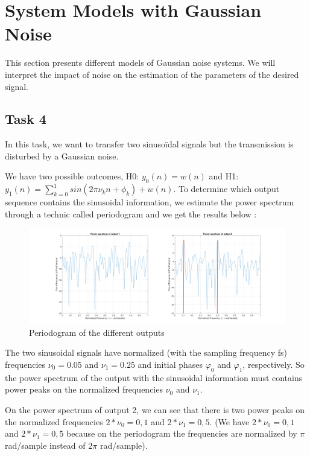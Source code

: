\documentclass[onecolumn, 12pt]{IEEEtran}
\begin{document}
\section{System Models with Gaussian Noise}

This section presents different models of Gaussian noise systems. We will interpret the impact of noise on the estimation of the parameters of the desired signal.

\subsection*{Task 4}

In this task, we want to transfer two sinusoïdal signals but the transmission is disturbed by a Gaussian noise. 

We have two possible outcomes, H0: $y_0(n) = w(n)$ and H1: $y_1(n) = \sum_{k=0}^{1}{sin(2\pi \nu_k n + \phi_k)} + w(n)$. To determine which output sequence contains the sinusoïdal information, we estimate the power spectrum through a technic called periodogram and we get the results below :

\begin{multicols}{2}
\begin{figure}[H]
	\centering
	\includegraphics[scale = 0.11]{Task4.png}
	\caption{Periodogram of the different outputs}
\label{fig:Fig4}
\end{figure}

The two sinusoidal signals have normalized (with the sampling frequency fs) frequencies $\nu_0 = 0.05$ and $\nu_1 = 0.25$ and initial phases $\varphi_0$ and $\varphi_1$, respectively. So the power spectrum of the output with the sinusoïdal information must contains power peaks on the normalized frequencies $\nu_0$ and $\nu_1$.
\end{multicols}




On the power spectrum of output 2, we can see that there is two power peaks on the normalized frequencies $2*\nu_0 = 0,1$ and $2*\nu_1 = 0,5$. (We have $2*\nu_0 = 0,1$ and $2*\nu_1 = 0,5$ because on the periodogram the frequencies are normalized by $\pi$ rad/sample instead of $2\pi$ rad/sample).
\newline
\end{document}
